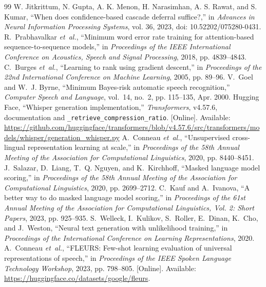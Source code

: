 \begin{thebibliography}{99}
 W. Jitkrittum, N. Gupta, A. K. Menon, H. Narasimhan, A. S. Rawat, and S. Kumar, ``When does confidence-based cascade deferral suffice?,'' in \textit{Advances in Neural Information Processing Systems}, vol. 36, 2023, doi: 10.52202/075280-0431.
R.~Prabhavalkar \emph{et~al.}, ``{Minimum word error rate training for attention-based sequence-to-sequence models},'' in \emph{Proceedings of the IEEE International Conference on Acoustics, Speech and Signal Processing}, 2018, pp. 4839--4843.
C.~Burges \emph{et~al.}, ``{Learning to rank using gradient descent},'' in \emph{Proceedings of the 22nd International Conference on Machine Learning}, 2005, pp. 89--96.
V.~Goel and W.~J. Byrne, ``{Minimum Bayes-risk automatic speech recognition},'' \emph{Computer Speech and Language}, vol.~14, no.~2, pp. 115--135, Apr. 2000.
Hugging Face, ``Whisper generation implementation,'' \emph{Transformers}, v4.57.6, documentation and \texttt{\_retrieve\_compression\_ratio}. [Online]. Available: \url{https://github.com/huggingface/transformers/blob/v4.57.6/src/transformers/models/whisper/generation_whisper.py}
A.~Conneau \emph{et~al.}, ``{Unsupervised cross-lingual representation learning at scale},'' in \emph{Proceedings of the 58th Annual Meeting of the Association for Computational Linguistics}, 2020, pp. 8440--8451.
J.~Salazar, D.~Liang, T.~Q. Nguyen, and K.~Kirchhoff, ``{Masked language model scoring},'' in \emph{Proceedings of the 58th Annual Meeting of the Association for Computational Linguistics}, 2020, pp. 2699--2712.
C.~Kauf and A.~Ivanova, ``{A better way to do masked language model scoring},'' in \emph{Proceedings of the 61st Annual Meeting of the Association for Computational Linguistics, Vol. 2: Short Papers}, 2023, pp. 925--935.
\BIBentryALTinterwordspacing
S.~Welleck, I.~Kulikov, S.~Roller, E.~Dinan, K.~Cho, and J.~Weston, ``{Neural text generation with unlikelihood training},'' in \emph{Proceedings of the International Conference on Learning Representations}, 2020.
\BIBentrySTDinterwordspacing
{}
\BIBentryALTinterwordspacing
A.~Conneau \emph{et~al.}, ``{FLEURS: Few-shot learning evaluation of universal representations of speech},'' in \emph{Proceedings of the IEEE Spoken Language Technology Workshop}, 2023, pp. 798--805. [Online]. Available: \url{https://huggingface.co/datasets/google/fleurs}.
\BIBentrySTDinterwordspacing
{}
\BIBentryALTinterwordspacing

\end{thebibliography}
